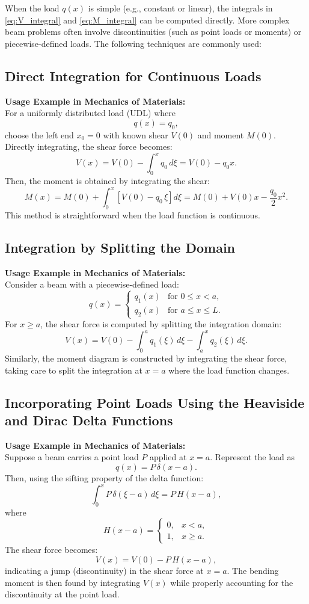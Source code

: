\documentclass[12pt]{article}
\begin{document}
When the load $q(x)$ is simple (e.g., constant or linear), the integrals in \eqref{eq:V_integral} and \eqref{eq:M_integral} can be computed directly. More complex beam problems often involve discontinuities (such as point loads or moments) or piecewise-defined loads. The following techniques are commonly used:

\subsection{Direct Integration for Continuous Loads}
\textbf{Usage Example in Mechanics of Materials:} \\
For a uniformly distributed load (UDL) where
\[
q(x) = q_0,
\]
choose the left end $x_0=0$ with known shear $V(0)$ and moment $M(0)$. Directly integrating, the shear force becomes:
\[
V(x) = V(0) - \int_{0}^{x} q_0\, d\xi = V(0) - q_0 x.
\]
Then, the moment is obtained by integrating the shear:
\[
M(x) = M(0) + \int_{0}^{x} \left[ V(0) - q_0\,\xi \right] d\xi = M(0) + V(0)x - \frac{q_0}{2} x^2.
\]
This method is straightforward when the load function is continuous.

\subsection{Integration by Splitting the Domain}
\textbf{Usage Example in Mechanics of Materials:} \\
Consider a beam with a piecewise-defined load:
\[
q(x) = \begin{cases}
q_1(x) & \text{for } 0 \le x < a, \\
q_2(x) & \text{for } a \le x \le L.
\end{cases}
\]
For $x \ge a$, the shear force is computed by splitting the integration domain:
\[
V(x) = V(0) - \int_{0}^{a} q_1(\xi)\, d\xi - \int_{a}^{x} q_2(\xi)\, d\xi.
\]
Similarly, the moment diagram is constructed by integrating the shear force, taking care to split the integration at $x=a$ where the load function changes.

\subsection{Incorporating Point Loads Using the Heaviside and Dirac Delta Functions}
\textbf{Usage Example in Mechanics of Materials:} \\
Suppose a beam carries a point load $P$ applied at $x=a$. Represent the load as
\[
q(x) = P\,\delta(x-a).
\]
Then, using the sifting property of the delta function:
\[
\int_{0}^{x} P\,\delta(\xi-a)\, d\xi = P\,H(x-a),
\]
where
\[
H(x-a) = \begin{cases}
0, & x < a, \\
1, & x \ge a.
\end{cases}
\]
The shear force becomes:
\[
V(x) = V(0) - P\,H(x-a),
\]
indicating a jump (discontinuity) in the shear force at $x=a$. The bending moment is then found by integrating $V(x)$ while properly accounting for the discontinuity at the point load.
\end{document}
